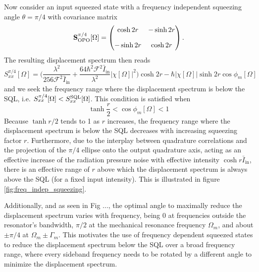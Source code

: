 Now consider an input squeezed state with a frequency independent squeezing angle $\theta=\pi/4$ with covariance matrix
\begin{equation*}
  \mathbf{S}^{\pi/4}_{\rm OPO}[\Omega] = \begin{pmatrix}
         \cosh 2r   & -\sinh 2r  \\[10pt]
        -\sinh 2r  & \cosh 2r  
      \end{pmatrix}.
\end{equation*}
The resulting displacement spectrum then reads
\begin{equation}
  S_{xx}^{\pi/4}[\Omega] = \Big(\dfrac{\lambda^2}{256 \mathcal{F}^2 \bar{I}_\mathrm{in}}+  \dfrac{64 \hbar^2 \mathcal{F}^2 \bar{I}_\mathrm{in}}{\lambda^2}|\chi[\Omega]|^2\Big)\cosh 2r - \hbar |\chi[\Omega]| \sinh 2r \cos \phi_m[\Omega]
\end{equation}
and we seek the frequency range where the displacement spectrum is below the SQL, i.e. $S_{xx}^{\pi/4}[\Omega] < S_{xx}^{\rm SQL}[\Omega]$. This condition is satisfied when
\begin{equation}
  \tanh \dfrac{r}{2} < \cos \phi_m[\Omega] < 1
\end{equation}
Because $\tanh r/2$ tends to 1 as $r$ increases, the frequency range where the displacement spectrum is below the SQL decreases with increasing squeezing factor $r$. Furthermore, due to the interplay between quadrature correlations and the projection of the $\pi/4$ ellipse onto the output quadrature axis, acting as an effective increase of the radiation pressure noise with effective intensity $\cosh r \bar{I}_\mathrm{in}$, there is an effective range of $r$ above which the displacement spectrum is always above the SQL (for a fixed input intensity). This is illustrated in figure \ref{fig:freq_indep_squeezing}.

Additionally, and as seen in Fig ..., the optimal angle to maximally reduce the displacement spectrum varies with frequency, being 0 at frequencies outside the resonator's bandwidth, $\pi/2$ at the mechanical resonance frequency $\Omega_m$, and about $\pm\pi/4$ at $\Omega_m \pm \Gamma_m$. This motivates the use of frequency dependent squeezed states to reduce the displacement spectrum below the SQL over a broad frequency range, where every sideband frequency needs to be rotated by a different angle to minimize the displacement spectrum.
